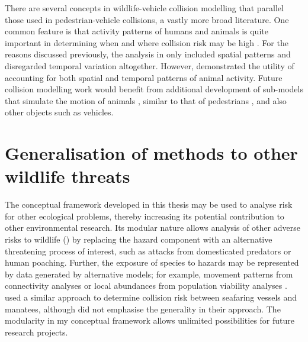 There are several concepts in wildlife-vehicle collision modelling that parallel those used in pedestrian-vehicle collisions, a vastly more broad literature. One common feature is that activity patterns of humans and animals is quite important in determining when and where collision risk may be high \citep{mira11,lao11}. For the reasons discussed previously, the analysis in  only included spatial patterns and disregarded temporal variation altogether. However,  demonstrated the utility of accounting for both spatial and temporal patterns of animal activity. Future collision modelling work would benefit from additional development of sub-models that simulate the motion of animals \citep[see][]{jaar07}, similar to that of pedestrians \citep[see][]{lohn10}, and also other objects such as vehicles.

\section{Generalisation of methods to other wildlife threats}

The conceptual framework developed in this thesis may be used to analyse risk for other ecological problems, thereby increasing its potential contribution to other environmental research. Its modular nature allows analysis of other adverse risks to wildlife () by replacing the hazard component with an alternative threatening process of interest, such as attacks from domesticated predators or human poaching. Further, the exposure of species to hazards may be represented by data generated by alternative models; for example, movement patterns from connectivity analyses \citep{mcra08} or local abundances from population viability analyses \citep{beis02}. \cite{baud13} used a similar approach to determine collision risk between seafaring vessels and manatees, although did not emphasise the generality in their approach. The modularity in my conceptual framework allows unlimited possibilities for future research projects.

